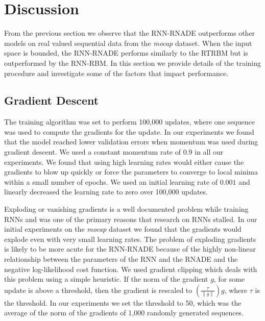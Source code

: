 \documentclass{article} %
\begin{document}
\section{Discussion}
\label{Discussion}
From the previous section we observe that the RNN-RNADE outperforms other models on real valued sequential data from the \textit{mocap} dataset. When the input space is bounded, the RNN-RNADE performs similarly to the RTRBM but is outperformed by the RNN-RBM. In this section we provide details of the training procedure and investigate some of the factors that impact performance. 
\subsection{Gradient Descent}
 The training algorithm was set to perform 100,000 updates, where one sequence was used to compute the gradients for the update. In our experiments we found that the model reached lower validation errors when momentum was used during gradient descent. We used a constant momentum rate of $0.9$ in all our experiments. We found that using high learning rates would either cause the gradients to blow up quickly or force the parameters to converge to local minima within a small number of epochs. We used an initial learning rate of $0.001$ and linearly decreased the learning rate to zero over 100,000 updates. 

Exploding or vanishing gradients is a well documented problem while training RNNs and was one of the primary reasons that research on RNNs stalled. In our initial experiments on the \textit{mocap} dataset we found that the gradients would explode even with very small learning rates. The problem of exploding gradients is likely to be more acute for the RNN-RNADE because of the highly non-linear relationship between the parameters of the RNN and the RNADE and the negative log-likelihood cost function. We used gradient clipping \cite{bengio2012advances} which deals with this problem using a simple heuristic. If the norm of the gradient $g$, for some update is above a threshold, then the gradient is rescaled to $(\frac{\tau}{\left\lVert g \right\rVert})g$, where $\tau$ is the threshold. In our experiments we set the threshold to 50, which was the average of the norm of the gradients of 1,000 randomly generated sequences. 
\end{document}
